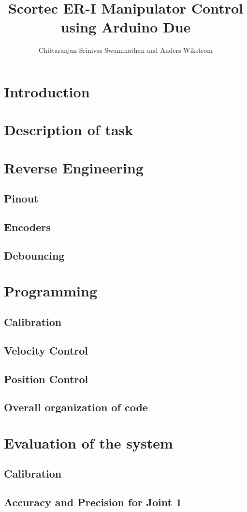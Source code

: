 \documentclass[10pt,a4paper]{article}
\author{Chittaranjan Srinivas Swaminathan and Anders Wikstrom}
\title{Scortec ER-I Manipulator Control using Arduino Due}
\begin{document}
\maketitle
\tableofcontents
\section{Introduction}

\section{Description of task}

\section{Reverse Engineering}

\subsection{Pinout}
\subsection{Encoders}
\subsection{Debouncing}

\section{Programming}

\subsection{Calibration}
\subsection{Velocity Control}
\subsection{Position Control}
\subsection{Overall organization of code}

\section{Evaluation of the system}

\subsection{Calibration}
\subsection{Accuracy and Precision for Joint 1}
\end{document}
